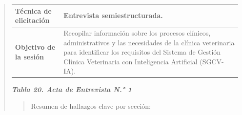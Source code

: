 \documentclass[
]{article}
\begin{document}
\begin{quote}
{\begin{longtable}[]{|
  >{\raggedright\arraybackslash}p{}|
  >{\raggedright\arraybackslash}p{}|}
\hline
\textbf{Técnica de elicitación} &
\begin{minipage}[t]{\linewidth}\raggedright
Entrevista semiestructurada.
\end{minipage} \\
\hline
\textbf{Objetivo de la sesión} &
\begin{minipage}[t]{\linewidth}\raggedright
Recopilar información sobre los procesos clínicos, administrativos y las
necesidades de la clínica veterinaria para identificar los requisitos
del Sistema de Gestión Clínica Veterinaria con Inteligencia Artificial
(SGCV-IA).
\end{minipage} \\
\hline
\end{longtable}
}

\protect{}\label{_bookmark79}{}\emph{\textbf{Tabla 20. Acta
de Entrevista N.° 1}}

\begin{quote}
Resumen de hallazgos clave por sección:
\end{quote}


\end{quote}
\end{document}
